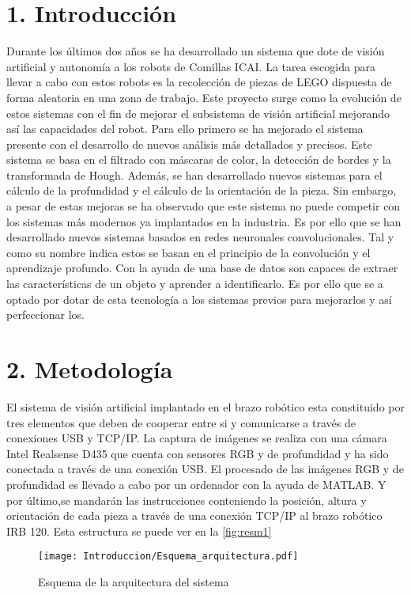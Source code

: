 {\section*{1. Introducción}
Durante los últimos dos años se ha desarrollado un sistema que dote de visión artificial y autonomía a los robots de Comillas ICAI. La tarea escogida para llevar a cabo con estos robots es la recolección de piezas de LEGO dispuesta de forma aleatoria en una zona de trabajo. Este proyecto surge como la evolución de estos sistemas con el fin de mejorar el subsistema de visión artificial mejorando así las capacidades del robot. Para ello primero se ha mejorado el sistema presente con el desarrollo de nuevos análisis más detallados y precisos. Este sistema se basa en el filtrado con máscaras de color, la detección de bordes y la transformada de Hough. Además, se han desarrollado nuevos sistemas para el cálculo de la profundidad y el cálculo de la orientación de la pieza. Sin embargo, a pesar de estas mejoras se ha observado que este sistema no puede competir con los sistemas más modernos ya implantados en la industria. Es por ello que se han desarrollado nuevos sistemas basados en redes neuronales convolucionales. Tal y como su nombre indica estos se basan en el principio de la convolución y el aprendizaje profundo. Con la ayuda de una base de datos son capaces de extraer las características de un objeto y aprender a identificarlo. Es por ello que se a optado por dotar de esta tecnología a los sistemas previos para mejorarlos y así perfeccionar los.

\section*{2. Metodología}
El sistema de visión artificial implantado en el brazo robótico esta constituido por tres elementos que deben de cooperar entre si y comunicarse a través de conexiones USB y TCP/IP. La captura de imágenes se realiza con una cámara Intel Realsense D435 que cuenta con sensores RGB y de profundidad y ha sido conectada a través de una conexión USB. El procesado de las imágenes RGB y de profundidad es llevado a cabo por un ordenador con la ayuda de MATLAB. Y por último,se mandarán las instrucciones conteniendo la posición, altura y orientación de cada pieza a través de una conexión TCP/IP al brazo robótico IRB 120. Esta estructura se puede ver en la \autoref{fig:resm1}

\begin{figure}[ht]
	\centering
	\texttt{[image: Introduccion/Esquema\_arquitectura.pdf]}
	\caption{Esquema de la arquitectura del sistema}
	\label{fig:resm1}
	\vspace{-5pt}
\end{figure}

}
